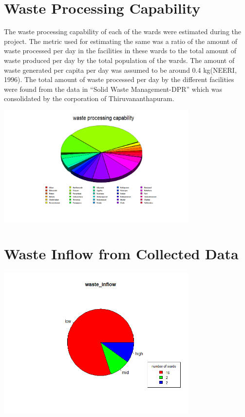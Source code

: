 \documentclass[12pt,a4paper]{  report}
\begin{document}
\section{Waste Processing Capability}
\begin{justify}
	The waste processing capability of each of the wards were estimated during the project. The metric used for estimating the same was a ratio of the amount of waste processed per day  in the facilities in these wards to the total amount of waste produced  per day by the total population of the wards. 
	The amount of waste generated per capita per day was assumed  to be around 0.4 kg(NEERI, 1996).
	The total amount of waste processed per day by the different facilities were found from the data in “Solid Waste Management-DPR” which was consolidated by the corporation of Thiruvananthapuram.
	
	\centering
	\includegraphics[width=0.75\textwidth]{wp}
	

	
\end{justify}
\section{Waste Inflow from Collected Data}

\begin{justify}
	
	\centering
	\includegraphics[width=0.75\textwidth]{wi}
\end{justify}
\end{document}

